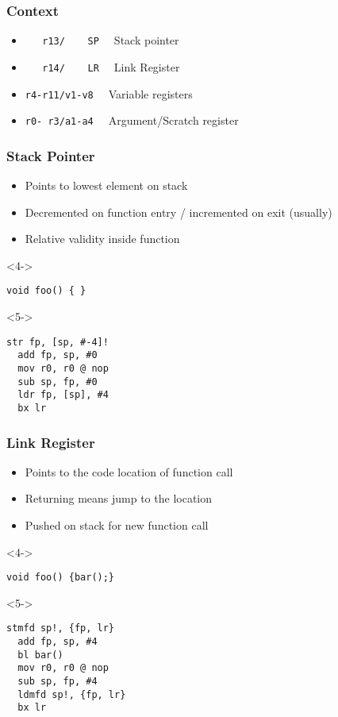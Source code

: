 \documentclass{beamer}
\begin{document}
\begin{frame}[fragile]
\frametitle{Context}
\begin{itemize}
\item<1-> \lstinline[columns=fixed]{   r13/    SP  } Stack pointer
\item<2-> \lstinline[columns=fixed]{   r14/    LR  } Link Register
\item<3-> \lstinline[columns=fixed]{r4-r11/v1-v8  } Variable registers
\item<4-> \lstinline[columns=fixed]{r0- r3/a1-a4  } Argument/Scratch register
\end{itemize}

\end{frame}

\begin{frame}[fragile]
\frametitle{Stack Pointer}
\begin{itemize}
\item<1-> Points to lowest element on stack
\item<2-> Decremented on function entry / incremented on exit (usually)
\item<3-> Relative validity inside function
\end{itemize}

\begin{block}<4->{}
\begin{lstlisting}
void foo() { }
\end{lstlisting}
\end{block}

\begin{block}<5->{}
\begin{lstlisting}[language=ASM]
  str fp, [sp, #-4]!
  add fp, sp, #0
  mov r0, r0 @ nop
  sub sp, fp, #0
  ldr fp, [sp], #4
  bx lr
\end{lstlisting}
\end{block}

\end{frame}

\begin{frame}[fragile]
\frametitle{Link Register}
\begin{itemize}
\item<1-> Points to the code location of function call
\item<2-> Returning means jump to the location
\item<3-> Pushed on stack for new function call
\end{itemize}

\begin{block}<4->{}
\begin{lstlisting}
void foo() {bar();}
\end{lstlisting}
\end{block}

\begin{block}<5->{}
\begin{lstlisting}[language=ASM]
  stmfd sp!, {fp, lr}
  add fp, sp, #4
  bl bar()
  mov r0, r0 @ nop
  sub sp, fp, #4
  ldmfd sp!, {fp, lr}
  bx lr
\end{lstlisting}
\end{block}

\end{frame}
\end{document}

